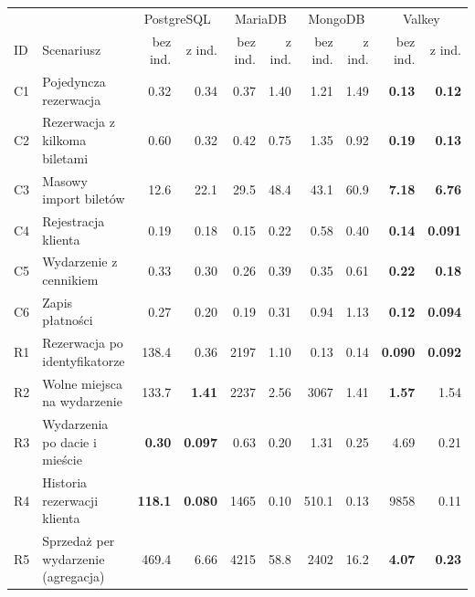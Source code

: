 \begin{tabular}{llrrrrrrrr}
\toprule
 & & \multicolumn{2}{c}{PostgreSQL} & \multicolumn{2}{c}{MariaDB} & \multicolumn{2}{c}{MongoDB} & \multicolumn{2}{c}{Valkey} \\
\cmidrule(lr){3-4}\cmidrule(lr){5-6}\cmidrule(lr){7-8}\cmidrule(lr){9-10}
ID & Scenariusz & bez ind. & z ind. & bez ind. & z ind. & bez ind. & z ind. & bez ind. & z ind. \\
\midrule
C1 & Pojedyncza rezerwacja & \num{0.32} & \num{0.34} & \num{0.37} & \num{1.40} & \num{1.21} & \num{1.49} & \textbf{\num{0.13}} & \textbf{\num{0.12}} \\
C2 & Rezerwacja z kilkoma biletami & \num{0.60} & \num{0.32} & \num{0.42} & \num{0.75} & \num{1.35} & \num{0.92} & \textbf{\num{0.19}} & \textbf{\num{0.13}} \\
C3 & Masowy import biletów & \num{12.6} & \num{22.1} & \num{29.5} & \num{48.4} & \num{43.1} & \num{60.9} & \textbf{\num{7.18}} & \textbf{\num{6.76}} \\
C4 & Rejestracja klienta & \num{0.19} & \num{0.18} & \num{0.15} & \num{0.22} & \num{0.58} & \num{0.40} & \textbf{\num{0.14}} & \textbf{\num{0.091}} \\
C5 & Wydarzenie z cennikiem & \num{0.33} & \num{0.30} & \num{0.26} & \num{0.39} & \num{0.35} & \num{0.61} & \textbf{\num{0.22}} & \textbf{\num{0.18}} \\
C6 & Zapis płatności & \num{0.27} & \num{0.20} & \num{0.19} & \num{0.31} & \num{0.94} & \num{1.13} & \textbf{\num{0.12}} & \textbf{\num{0.094}} \\
\midrule
R1 & Rezerwacja po identyfikatorze & \num{138.4} & \num{0.36} & \num{2197} & \num{1.10} & \num{0.13} & \num{0.14} & \textbf{\num{0.090}} & \textbf{\num{0.092}} \\
R2 & Wolne miejsca na wydarzenie & \num{133.7} & \textbf{\num{1.41}} & \num{2237} & \num{2.56} & \num{3067} & \num{1.41} & \textbf{\num{1.57}} & \num{1.54} \\
R3 & Wydarzenia po dacie i mieście & \textbf{\num{0.30}} & \textbf{\num{0.097}} & \num{0.63} & \num{0.20} & \num{1.31} & \num{0.25} & \num{4.69} & \num{0.21} \\
R4 & Historia rezerwacji klienta & \textbf{\num{118.1}} & \textbf{\num{0.080}} & \num{1465} & \num{0.10} & \num{510.1} & \num{0.13} & \num{9858} & \num{0.11} \\
R5 & Sprzedaż per wydarzenie (agregacja) & \num{469.4} & \num{6.66} & \num{4215} & \num{58.8} & \num{2402} & \num{16.2} & \textbf{\num{4.07}} & \textbf{\num{0.23}} \\

\end{tabular}

